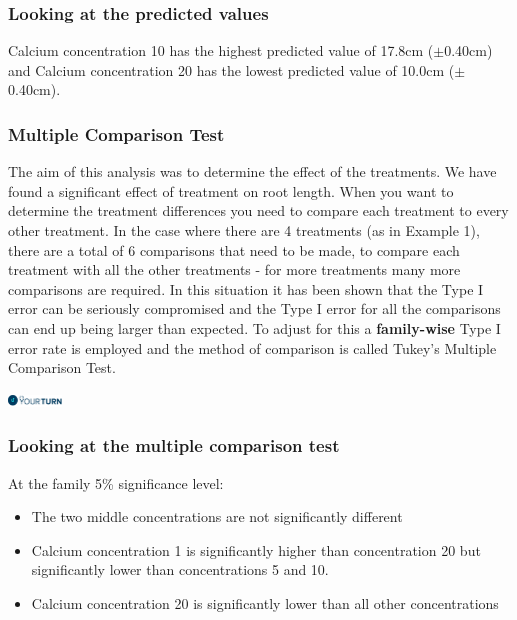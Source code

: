 
\begin{frame}\frametitle{Looking at the predicted values}
Calcium concentration 10 has the highest predicted value of
17.8cm ($\pm$0.40cm) and Calcium concentration 20 has the
lowest predicted value of 10.0cm ($\pm$0.40cm).
\end{frame}


\begin{frame}\frametitle{Multiple Comparison Test}
The aim of this analysis was to determine the effect of the treatments. We have found a significant effect of treatment
on root length. When you want to determine the treatment differences you need to compare each treatment to every other
treatment. In the case where there are 4 treatments (as in Example 1), there are a total of 6 comparisons that need to
be made, to compare each treatment with all the other treatments - for more treatments many more comparisons are
required. In this situation it has been shown that the Type I error can be seriously compromised and the Type I error
for all the comparisons can end up being larger than expected. To adjust for this a \textbf{family-wise} Type I error
rate is employed and the method of comparison is called Tukey's Multiple Comparison Test.


\vspace{1cm}
\flushright
\includegraphics[height = 0.3cm]{yourturn}

\end{frame}



\begin{frame}\frametitle{Looking at the multiple comparison test}
At the family 5\% significance level:
\begin{itemize}
\item The two middle concentrations are not significantly different
\item Calcium concentration 1 is significantly higher than concentration
             20 but significantly lower than concentrations 5 and 10.
\item Calcium concentration 20 is significantly lower than all other concentrations
\end{itemize}
\end{frame}




